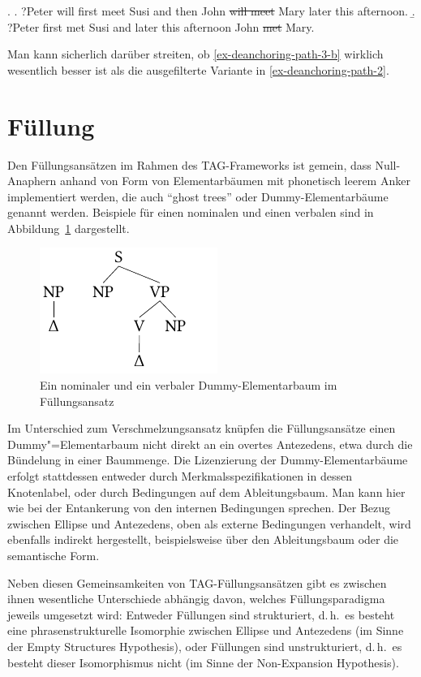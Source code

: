 \ex.
\a. ?Peter will first meet Susi and then John \sout{will meet} Mary later this afternoon.\label{ex-deanchoring-path-3-a}
\b. ?Peter first met Susi and later this afternoon John \sout{met} Mary.\label{ex-deanchoring-path-3-b} 

Man kann sicherlich darüber streiten, ob \ref{ex-deanchoring-path-3-b} wirklich wesentlich besser ist als die ausgefilterte Variante in \ref{ex-deanchoring-path-2}.


\section{Füllung} \label{sec-fuellung}

Den Füllungsansätzen im Rahmen des TAG-Frameworks ist gemein, dass Null-Anaphern anhand von Form von Elementarbäumen mit phonetisch leerem Anker implementiert werden, die auch "`ghost trees"' \citep{Seddah:Sagot:06} oder Dummy-Elementarbäume genannt werden. Beispiele für einen nominalen und einen verbalen  sind in Abbildung~\ref{fig-tag-fuellung-1} dargestellt.
\begin{figure}[t]
\centering
\includegraphics[angle=90]{graphics/abb824.pdf}
\caption{\label{fig-tag-fuellung-1}Ein nominaler und ein verbaler Dummy-Elementarbaum im Füllungsansatz}
\end{figure}  
Im Unterschied zum Verschmelzungsansatz knüpfen die Füllungsansätze einen Dummy"=Elementarbaum nicht direkt an ein overtes Antezedens, etwa durch die Bündelung in einer Baummenge. Die Lizenzierung der Dummy-Elementarbäume erfolgt stattdessen entweder durch Merkmalsspezifikationen in dessen Knotenlabel, oder durch Bedingungen auf dem Ableitungsbaum. Man kann hier wie bei der Entankerung von den internen Bedingungen sprechen. Der Bezug zwischen Ellipse und Antezedens, oben als externe Bedingungen verhandelt, wird ebenfalls indirekt hergestellt, beispielsweise über den Ableitungsbaum oder die semantische Form.

Neben diesen Gemeinsamkeiten von TAG-Füllungsansätzen gibt es zwischen ihnen wesentliche Unterschiede abhängig davon, welches Füllungsparadigma jeweils umgesetzt wird: Entweder Füllungen sind strukturiert, d.\,h.\ es besteht eine phrasenstrukturelle Isomorphie zwischen Ellipse und Antezedens (im Sinne der Empty Structures Hypothesis), oder Füllungen sind unstrukturiert, d.\,h.\ es besteht dieser Isomorphismus nicht (im Sinne der Non-Expansion Hypothesis).



